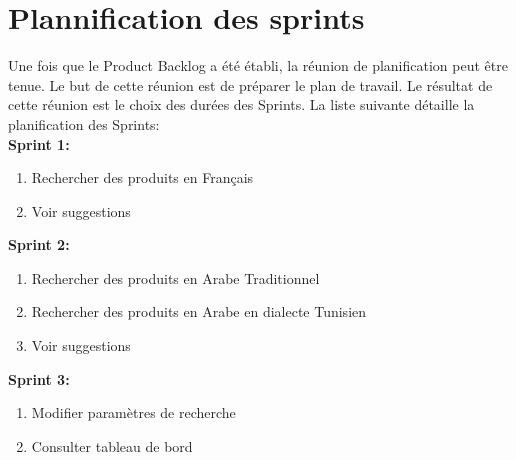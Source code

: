 \section{Plannification des sprints}
\noindent
Une fois que le Product Backlog a été établi, la réunion de planification peut être
tenue. Le but de cette réunion est de préparer le plan de travail. Le résultat de cette réunion est
le choix des durées des Sprints. La liste suivante détaille la planification des Sprints: \\

\newpage
\noindent
\textbf{Sprint 1:}
\begin{enumerate}
	\item Rechercher des produits en Français
	\item Voir suggestions
\end{enumerate}

\noindent
\textbf{Sprint 2:}
\begin{enumerate}
	\item Rechercher des produits en Arabe Traditionnel
	\item Rechercher des produits en Arabe en dialecte Tunisien
	\item Voir suggestions
\end{enumerate}

\noindent
\textbf{Sprint 3:}
\begin{enumerate}
	\item Modifier paramètres de recherche
	\item Consulter tableau de bord
\end{enumerate}


